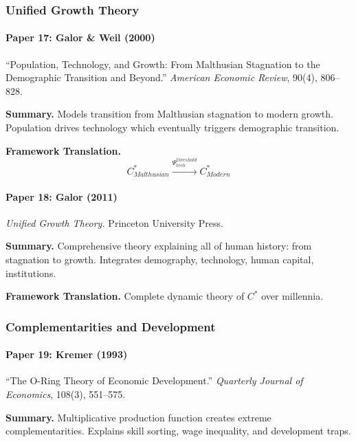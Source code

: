 \subsubsection{Unified Growth Theory}

\paragraph{Paper 17: Galor \& Weil (2000)}

``Population, Technology, and Growth: From Malthusian Stagnation to the 
Demographic Transition and Beyond.''
\textit{American Economic Review}, 90(4), 806--828.

\textbf{Summary.}
Models transition from Malthusian stagnation to modern growth. Population 
drives technology which eventually triggers demographic transition.

\textbf{Framework Translation.}
\begin{equation}
C^*_{Malthusian} \xrightarrow{\Psi_{tech}^{threshold}} C^*_{Modern}
\end{equation}

\paragraph{Paper 18: Galor (2011)}

\textit{Unified Growth Theory.}
Princeton University Press.

\textbf{Summary.}
Comprehensive theory explaining all of human history: from stagnation to growth.
Integrates demography, technology, human capital, institutions.

\textbf{Framework Translation.}
Complete dynamic theory of $C^*$ over millennia.

\subsubsection{Complementarities and Development}

\paragraph{Paper 19: Kremer (1993)}

``The O-Ring Theory of Economic Development.''
\textit{Quarterly Journal of Economics}, 108(3), 551--575.

\textbf{Summary.}
Multiplicative production function creates extreme complementarities. 
Explains skill sorting, wage inequality, and development traps.

